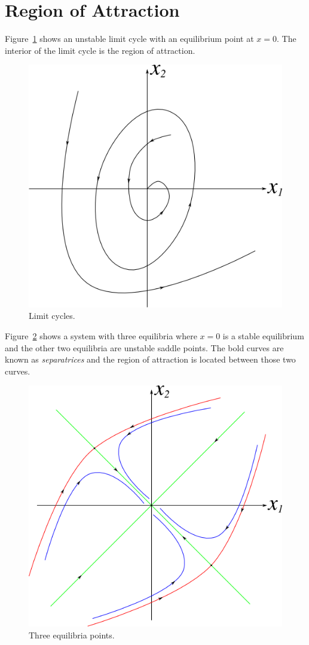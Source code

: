 \section{Region of Attraction}
Figure~\ref{fig:09unstableLimitCycles} shows an unstable limit cycle with an equilibrium point at $x=0$.
The interior of the limit cycle is the region of attraction.

\begin{figure}[ht!]
\centering
\includegraphics[width=.4\textwidth]{images/09unstableLimitCycles}
\caption{Limit cycles.}
\label{fig:09unstableLimitCycles}
\end{figure}

Figure~\ref{fig:09threeEq} shows a system with three equilibria where $x=0$ is a stable equilibrium and the other two equilibria are unstable saddle points.
The bold curves are known as \textit{separatrices} and the region of attraction is located between those two curves.

\begin{figure}[ht!]
\centering
\includegraphics[width=.4\textwidth]{images/09threeEq}
\caption{Three equilibria points.}
\label{fig:09threeEq}
\end{figure}

